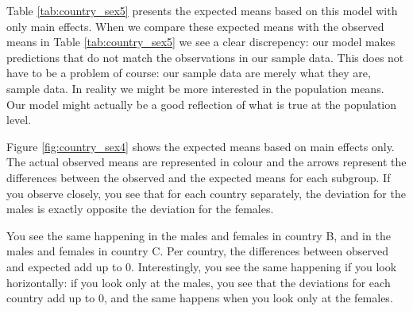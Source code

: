 Table \ref{tab:country_sex5} presents the expected means based on this model with only main effects. When we compare these expected means with the observed means in Table \ref{tab:country_sex5} we see a clear discrepency: our model makes predictions that do not match the observations in our sample data. This does not have to be a problem of course: our sample data are merely what they are, sample data. In reality we might be more interested in the population means. Our model might actually be a good reflection of what is true at the population level. 

Figure \ref{fig:country_sex4} shows the expected means based on main effects only. The actual observed means are represented in colour and the arrows represent the differences between the observed and the expected means for each subgroup. If you observe closely, you see that for each country separately, the deviation for the males is exactly opposite the deviation for the females. 

\begin{knitrout}
\color{fgcolor}\begin{kframe}


{\ttfamily\noindent\bfseries{}}

{\ttfamily\noindent\bfseries{}}

{\ttfamily\noindent\bfseries{}}\end{kframe}
\end{knitrout}

\begin{kframe}


{\ttfamily\noindent\bfseries{}}\end{kframe}



You see the same happening in the males and females in country B, and in the males and females in country C. Per country, the differences between observed and expected add up to 0. Interestingly, you see the same happening if you look horizontally: if you look only at the males, you see that the deviations for each country add up to 0, and the same happens when you look only at the females. 

